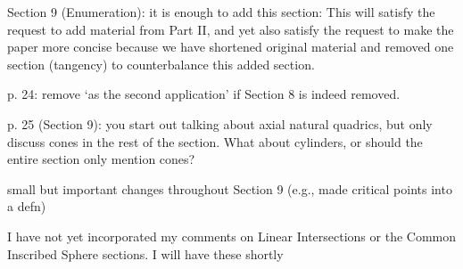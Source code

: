 Section 9 (Enumeration): it is enough to add this section:
	This will satisfy the request to add material from Part II,
	and yet also satisfy the request to make the paper more concise
	because we have shortened original material
	and removed one section (tangency) to counterbalance this
	added section.

p. 24: remove `as the second application' if Section 8 is indeed removed.
	
p. 25 (Section 9): you start out talking about axial natural quadrics,
	but only discuss cones in the rest of the section.
	What about cylinders, or should the entire section only mention	
	cones?

small but important changes throughout Section 9 
(e.g., made critical points into a defn)

I have not yet incorporated my comments on Linear Intersections
or the Common Inscribed Sphere sections.
I will have these shortly 
